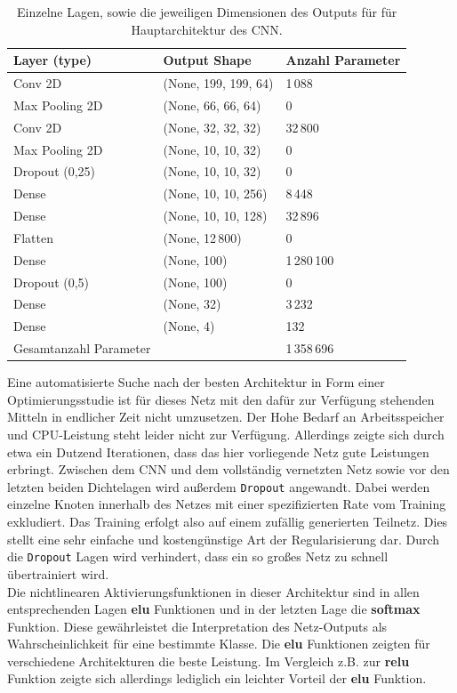 \begin{table}[htb]
  \centering%
  \begin{tabular}{l
                  l
                  l}
      \toprule
      Layer (type)    & Output Shape     & Anzahl Parameter      \\
      \midrule
      Conv 2D         & (None, 199, 199, 64)  & 1\,088 \\
      Max Pooling 2D  & (None, 66, 66, 64)    & 0 \\
      Conv 2D         & (None, 32, 32, 32)    & 32\,800 \\
      Max Pooling 2D  & (None, 10, 10, 32)    & 0 \\
      Dropout (0,25)  & (None, 10, 10, 32)    & 0 \\
      Dense           & (None, 10, 10, 256)   & 8\,448 \\
      Dense           & (None, 10, 10, 128)   & 32\,896 \\
      Flatten         & (None, 12\,800)         & 0 \\
      Dense           & (None, 100)           & 1\,280\,100 \\
      Dropout (0,5)   & (None, 100)           & 0 \\
      Dense           & (None, 32)            & 3\,232 \\
      Dense           & (None, 4)             & 132 \\
      \midrule
      Gesamtanzahl Parameter &                & 1\,358\,696 \\
      \bottomrule
  \end{tabular}
  \caption{Einzelne Lagen, sowie die jeweiligen Dimensionen des Outputs für für Hauptarchitektur des CNN.}
  \label{tab:haupt}
\end{table}
%
Eine automatisierte Suche nach der besten Architektur in Form einer
Optimierungsstudie ist für dieses Netz mit den dafür zur Verfügung stehenden
Mitteln in endlicher Zeit nicht umzusetzen. Der Hohe Bedarf an Arbeitsspeicher
und CPU-Leistung steht leider nicht zur Verfügung. Allerdings zeigte sich durch
etwa ein Dutzend Iterationen, dass das hier vorliegende Netz gute Leistungen
erbringt. Zwischen dem CNN und dem vollständig vernetzten Netz sowie vor
den letzten beiden Dichtelagen wird außerdem \texttt{Dropout} angewandt.
Dabei werden einzelne Knoten innerhalb des Netzes mit einer spezifizierten Rate
vom Training exkludiert. Das Training erfolgt also auf einem zufällig
generierten Teilnetz. Dies stellt eine sehr einfache und kostengünstige Art
der Regularisierung dar. Durch die \texttt{Dropout} Lagen wird verhindert,
dass ein so großes Netz zu schnell übertrainiert wird. \\
Die nichtlinearen Aktivierungsfunktionen in dieser Architektur sind in allen
entsprechenden Lagen \textbf{elu} Funktionen und in der letzten Lage die
\textbf{softmax} Funktion. Diese gewährleistet die Interpretation des
Netz-Outputs als Wahrscheinlichkeit für eine bestimmte Klasse.
Die \textbf{elu} Funktionen zeigten für verschiedene Architekturen die beste
Leistung. Im Vergleich z.B. zur \textbf{relu} Funktion zeigte sich allerdings
lediglich ein leichter Vorteil der \textbf{elu} Funktion.\\

